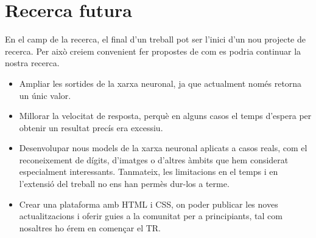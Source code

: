 \section{Recerca futura}
En el camp de la recerca, el final d'un treball pot ser l'inici d'un nou projecte de recerca. Per això creiem convenient fer propostes de com es podria continuar la nostra recerca.

\begin{itemize}

\item Ampliar les sortides de la xarxa neuronal, ja que actualment només retorna un únic valor.

\item Millorar la velocitat de resposta, perquè en alguns casos el temps d’espera per obtenir un resultat precís era excessiu.

\item Desenvolupar nous models de la xarxa neuronal aplicats a casos reals, com el reconeixement de dígits, d’imatges o d’altres àmbits que hem considerat especialment interessants. Tanmateix, les limitacions en el temps i en l’extensió del treball no ens han permès dur-los a terme.

\item Crear una plataforma amb HTML\cite{HTML} i CSS\cite{CSS}, on poder publicar les noves actualitzacions i oferir guies a la comunitat per a principiants, tal com nosaltres  ho érem en començar el TR.

\end{itemize}

